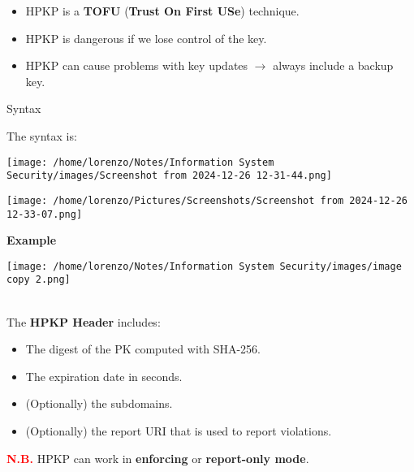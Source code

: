 \begin{itemize}
    \item HPKP is a \textbf{TOFU} (\textbf{Trust On First USe}) technique.
    \item HPKP is dangerous if we lose control of the key.
    \item HPKP can cause problems with key updates \(\rightarrow \) always include a backup key.
\end{itemize}
\begin{quotebox-grey}{Syntax}
    \begin{minipage}{0.4\textwidth}
    \vspace{-0.5cm}
        The syntax is:
        \begin{center}
            \texttt{[image: /home/lorenzo/Notes/Information System Security/images/Screenshot from 2024-12-26 12-31-44.png]} 
        \end{center} 
        \begin{center}
            \texttt{[image: /home/lorenzo/Pictures/Screenshots/Screenshot from 2024-12-26 12-33-07.png]} 
        \end{center}
        
    \end{minipage} 
    \hspace{1cm}
    \begin{minipage}{0.4\textwidth}
        \textbf{Example}
        \begin{center}
        \texttt{[image: /home/lorenzo/Notes/Information System Security/images/image copy 2.png]}
        \end{center}
    \end{minipage}
    \noindent
    \\
    The \textbf{HPKP Header} includes:
    \begin{itemize}
        \item The digest of the PK computed with SHA-256.
        \item The expiration date in seconds.
        \item (Optionally) the subdomains.
        \item (Optionally) the report URI that is used to report violations.
    \end{itemize}
    \textcolor{red}{\textbf{N.B.}} HPKP can work in \textbf{enforcing} or \textbf{report-only mode}.
\end{quotebox-grey}

